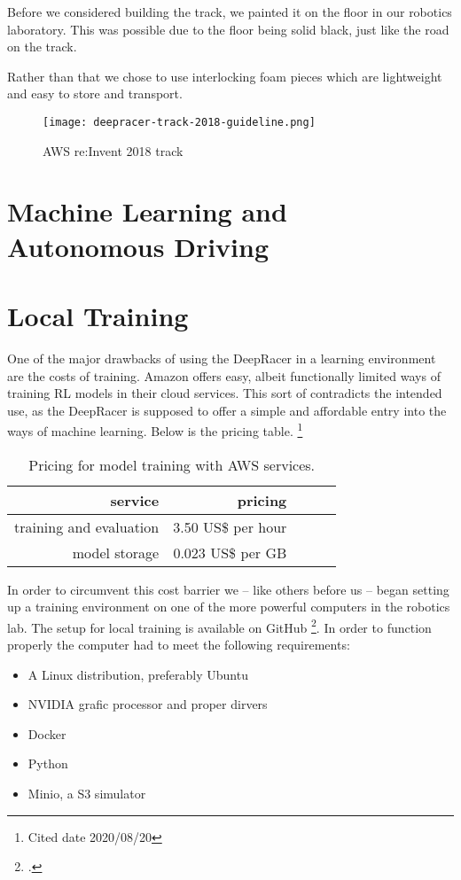 Before we considered building the track, we painted it on the floor in our robotics laboratory. This was possible due to the floor being solid black, just like the road on the track.

Rather than that we chose to use interlocking foam pieces which are lightweight and easy to store and transport.

\begin{figure}
    \centering
    \texttt{[image: deepracer-track-2018-guideline.png]}
    \caption{AWS re:Invent 2018 track}
    \label{fig:track}
\end{figure}

\section{Machine Learning and Autonomous Driving}


 \section{Local Training}
 
 One of the major drawbacks of using the DeepRacer in a learning environment are the costs of training. Amazon offers easy, albeit functionally limited ways of training RL models in their cloud services. This sort of contradicts the intended use, as the DeepRacer is supposed to offer a simple and affordable entry into the ways of machine learning. Below is the pricing table. \footnote{Cited date 2020/08/20}
 \begin{table}
 \caption{Pricing for model training with AWS services.}
 \label{tab:services}
 \centering
 \setlength{\tabcolsep}{5mm}
 \def\arraystretch{1.25}
 \begin{tabular}{|r|r|c|c|c|}
 \hline
 \textbf{service} & \textbf{pricing} \\
 \hline\hline
 training and evaluation & 3.50 US\$ per hour \\
 \hline
 model storage & 0.023 US\$ per GB \\
 \hline
 \end{tabular}
 \end{table}
 In order to circumvent this cost barrier we -- like others before us -- began setting up a training environment on one of the more powerful computers in the robotics lab.
 The setup for local training is available on GitHub \footcite{https://github.com/aws-deepracer-community/deepracer}. In order to function properly the computer had to meet the following requirements:
 \begin{itemize}
 \item A Linux distribution, preferably Ubuntu
 \item NVIDIA grafic processor and proper dirvers
 \item Docker
 \item Python
 \item Minio, a S3 simulator
 \end{itemize}